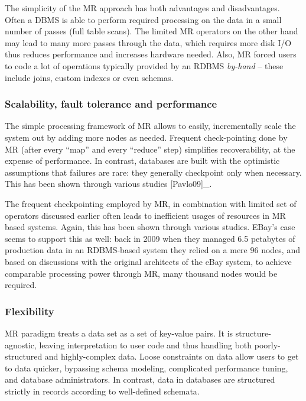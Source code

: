 \documentclass[DM,lsstdraft,toc]{lsstdoc}
\begin{document}
The simplicity of the MR approach has both advantages and disadvantages.
Often a DBMS is able to perform required processing on the data in a
small number of passes (full table scans). The limited MR operators on
the other hand may lead to many more passes through the data, which
requires more disk I/O thus reduces performance and increases hardware
needed. Also, MR forced users to code a lot of operations typically
provided by an RDBMS \emph{by-hand} -- these include joins, custom
indexes or even schemas.

\subsubsection{Scalability, fault tolerance and
performance}\label{scalability-fault-tolerance-and-performance}

The simple processing framework of MR allows to easily, incrementally
scale the system out by adding more nodes as needed. Frequent
check-pointing done by MR (after every ``map'' and every ``reduce''
step) simplifies recoverability, at the expense of performance. In
contrast, databases are built with the optimistic assumptions that
failures are rare: they generally checkpoint only when necessary. This
has been shown through various studies {[}Pavlo09{]}\_.

The frequent checkpointing employed by MR, in combination with limited
set of operators discussed earlier often leads to inefficient usages of
resources in MR based systems. Again, this has been shown through
various studies. EBay's case seems to support this as well: back in 2009
when they managed 6.5 petabytes of production data in an RDBMS-based
system they relied on a mere 96 nodes, and based on discussions with the
original architects of the eBay system, to achieve comparable processing
power through MR, many thousand nodes would be required.

\subsubsection{Flexibility}\label{flexibility}

MR paradigm treats a data set as a set of key-value pairs. It is
structure-agnostic, leaving interpretation to user code and thus
handling both poorly-structured and highly-complex data. Loose
constraints on data allow users to get to data quicker, bypassing schema
modeling, complicated performance tuning, and database administrators.
In contrast, data in databases are structured strictly in records
according to well-defined schemata.
\end{document}
